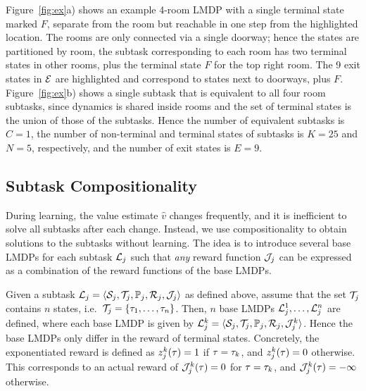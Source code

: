\begin{example}[Example 1]
 Figure~\ref{fig:ex}a) shows an example 4-room LMDP with a single terminal state marked $F$, separate from the room but reachable in one step from the highlighted location. The rooms are only connected via a single doorway; hence the states are partitioned by room, the subtask corresponding to each room has two terminal states in other rooms, plus the terminal state $F$ for the top right room. The 9 exit states in $\mathcal{E}$ are highlighted and correspond to states next to doorways, plus $F$. Figure~\ref{fig:ex}b) shows a single subtask that is equivalent to all four room subtasks, since dynamics is shared inside rooms and the set of terminal states is the union of those of the subtasks.
Hence the number of equivalent subtasks is $C=1$, the number of non-terminal and terminal states of subtasks is $K=25$ and $N=5$, respectively, and the number of exit states is $E=9$.
\end{example}

\subsection{Subtask Compositionality}

During learning, the value estimate $\widehat{v}$ changes frequently, and it is inefficient to solve all subtasks after each change. Instead, we use compositionality to obtain solutions to the subtasks without learning. The idea is to introduce several base LMDPs for each subtask $\mathcal{L}_j$ such that {\em any} reward function $\mathcal{J}_j$ can be expressed as a combination of the reward functions of the base LMDPs.

Given a subtask $\mathcal{L}_j=\langle\mathcal{S}_j,\mathcal{T}_j,\mathbb{P}_j,\mathcal{R}_j,\mathcal{J}_j\rangle$ as defined above, assume that the set $\mathcal{T}_j$ contains $n$ states, i.e.~$\mathcal{T}_j=\{\tau_1,\ldots,\tau_n\}$. Then, $n$ base LMDPs $\mathcal{L}_j^1,\ldots,\mathcal{L}_j^n$ are defined, where each base LMDP is given by $\mathcal{L}_j^k=\langle\mathcal{S}_j,\mathcal{T}_j,\mathbb{P}_j,\mathcal{R}_j,\mathcal{J}_j^k\rangle$. Hence the base LMDPs only differ in the reward of terminal states.
Concretely, the exponentiated reward is defined as $z_j^k(\tau)=1$ if $\tau=\tau_k$, and $z_j^k(\tau)=0$ otherwise.
This corresponds to an actual reward of $\mathcal{J}_j^k(\tau)=0$ for $\tau=\tau_k$, and $\mathcal{J}_j^k(\tau)=-\infty$ otherwise.

